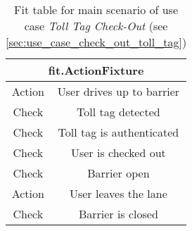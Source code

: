 
\begin{table}
\begin{centering}
\begin{tabular}{|c|c||c||c||c|}
\hline 
\multicolumn{5}{|c|}{fit.ActionFixture}\tabularnewline
\hline 
Action & \multicolumn{4}{c|}{User drives up to barrier}\tabularnewline
\hline 
Check & \multicolumn{4}{c|}{Toll tag detected}\tabularnewline
\hline 
Check & \multicolumn{4}{c|}{Toll tag is authenticated}\tabularnewline
\hline 
Check & \multicolumn{4}{c|}{User is checked out}\tabularnewline
\hline 
Check & \multicolumn{4}{c|}{Barrier open}\tabularnewline
\hline 
Action & \multicolumn{4}{c|}{User leaves the lane}\tabularnewline
\hline 
Check & \multicolumn{4}{c|}{Barrier is closed}\tabularnewline
\hline 
\end{tabular}
\par\end{centering}

\caption{Fit table for main scenario of use case \emph{Toll Tag Check-Out} (see \autoref{sec:use_case_check_out_toll_tag})}
\end{table}
